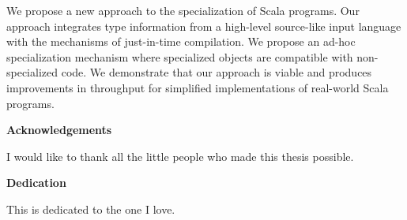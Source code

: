 We propose a new approach to the specialization of Scala programs.
Our approach integrates type information from a high-level source-like input language with the mechanisms of just-in-time compilation.
We propose an ad-hoc specialization mechanism where specialized objects are compatible with non-specialized code.
We demonstrate that our approach is viable and produces improvements in throughput for simplified implementations of real-world Scala programs.

\cleardoublepage


\begin{center}\textbf{Acknowledgements}\end{center}

I would like to thank all the little people who made this thesis possible.
\cleardoublepage


\begin{center}\textbf{Dedication}\end{center}

This is dedicated to the one I love.
\cleardoublepage

\renewcommand\contentsname{Table of Contents}
\tableofcontents
\cleardoublepage
{}    %

\listoftables
\cleardoublepage
{}		%

\listoffigures
\cleardoublepage
{}		%

\printglossaries
\cleardoublepage
{}		%


